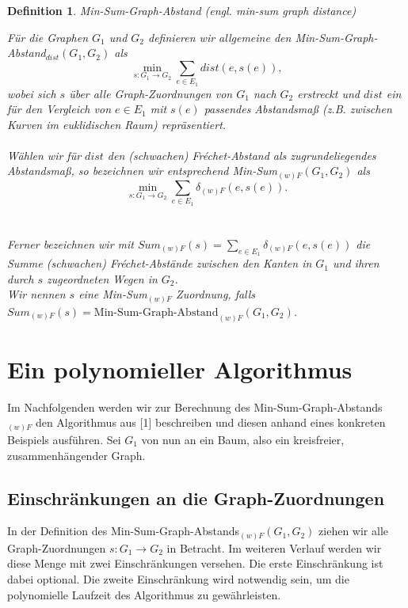 \documentclass[a4paper, 12pt, twoside]{article}
\theoremstyle{Format1} %
\newtheorem{Def}{Definition}[section]       %
\begin{document}
\begin{Def} \label{Definition Min-Sum}
	Min-Sum-Graph-Abstand (engl. min-sum graph distance)

	Für die Graphen $G_1$ und $G_2$ definieren wir allgemeine den \textit{Min-Sum-Graph-Abstand}$_{dist}(G_1, G_2)$ als
	$$\min_{s: G_1 \to G_2} \sum_{e \in E_1} dist(e, s(e)),$$
	wobei sich $s$ über alle Graph-Zuordnungen von $G_1$ nach $G_2$ erstreckt und $dist$ ein für den Vergleich von $e \in E_1$ mit $s(e)$
	passendes Abstandsmaß (z.B. zwischen Kurven im euklidischen Raum) repräsentiert.
	\\
	\\
	Wählen wir für $dist$ den (schwachen) Fréchet-Abstand als zugrundeliegendes Abstandsmaß, so bezeichnen wir entsprechend
	\textit{Min-Sum}$_{(w)F}(G_1, G_2)$ als $$\min_{s: G_1 \to G_2} \sum_{e \in E_1} \delta_{(w)F}(e, s(e)).$$
	\\
	\\
	Ferner bezeichnen wir mit $Sum_{(w)F}(s) = \sum_{e \in E_1}\delta_{(w)F}(e, s(e))$ die Summe (schwachen) Fréchet-Abstände zwischen den Kanten
	in $G_1$ und ihren durch $s$ zugeordneten Wegen in $G_2$.
	\\
	Wir nennen $s$ eine Min-Sum$_{(w)F}$ Zuordnung, falls
	\\
	$Sum_{(w)F}(s) = \text{Min-Sum-Graph-Abstand}_{(w)F}(G_1,G_2)$.

\end{Def}

\section{Ein polynomieller Algorithmus}

Im Nachfolgenden werden wir zur Berechnung des Min-Sum-Graph-Abstands$_{(w)F}$ den Algorithmus aus [1] beschreiben und diesen anhand eines konkreten Beispiels ausführen.
Sei $G_1$ von nun an ein Baum, also ein kreisfreier, zusammenhängender Graph.

\subsection{Einschränkungen an die Graph-Zuordnungen} \label{Einschränkungen}
In der Definition des Min-Sum-Graph-Abstands$_{(w)F}(G_1, G_2)$ ziehen wir alle Graph-Zuordnungen $s: G_1 \to G_2$ in Betracht.
Im weiteren Verlauf werden wir diese Menge mit zwei Einschränkungen versehen.
Die erste Einschränkung ist dabei optional. Die zweite Einschränkung wird notwendig sein, um die polynomielle Laufzeit des Algorithmus zu gewährleisten.
\end{document}
